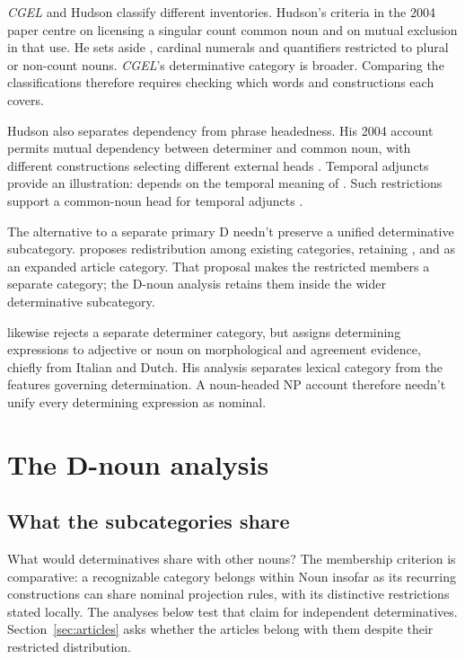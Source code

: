 \documentclass[12pt]{article}
\begin{document}
\textit{CGEL} and Hudson classify different inventories. Hudson's criteria in the 2004 paper centre on licensing a singular count common noun and on mutual exclusion in that use. He sets aside , cardinal numerals and quantifiers restricted to plural or non-count nouns. \textit{CGEL}'s determinative category is broader. Comparing the classifications therefore requires checking which words and constructions each covers.

Hudson also separates dependency from phrase headedness. His 2004 account permits mutual dependency between determiner and common noun, with different constructions selecting different external heads \citep[7--9]{hudson2004determiners}. Temporal adjuncts provide an illustration:  depends on the temporal meaning of . Such restrictions support a common-noun head for temporal adjuncts \citep[10--12]{hudson2004determiners}.

The alternative to a separate primary D needn't preserve a unified determinative subcategory. \textcite{spinillo2004reconceptualising} proposes redistribution among existing categories, retaining ,  and  as an expanded article category. That proposal makes the restricted members a separate category; the D-noun analysis retains them inside the wider determinative subcategory.

\textcite{vaneynde2003determiner} likewise rejects a separate determiner category, but assigns determining expressions to adjective or noun on morphological and agreement evidence, chiefly from Italian and Dutch. His analysis separates lexical category from the features governing determination. A noun-headed NP account therefore needn't unify every determining expression as nominal.


\section{The D-noun analysis}\label{sec:proposal}

\subsection{What the subcategories share}

What would determinatives share with other nouns? The membership criterion is comparative: a recognizable category belongs within Noun insofar as its recurring constructions can share nominal projection rules, with its distinctive restrictions stated locally. The analyses below test that claim for independent determinatives. Section~\ref{sec:articles} asks whether the articles belong with them despite their restricted distribution.
\end{document}
